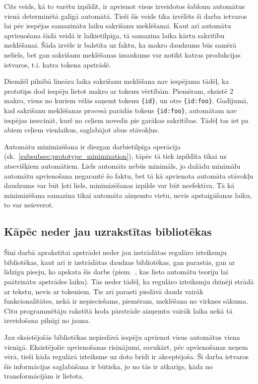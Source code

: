 Cits veids, kā to varētu izpildīt, ir apvienot visus izveidotos šablonu automātus vienā determinētā galīgā automātā. Tieši šīs veids tika izvēlēts šī darba ietvaros lai pēc iespējas samazinātu laiku sakrišanu meklēšanai. Kaut arī automātu apvienošana šādā veidā ir laikietilpīga, tā samazina laika kārtu sakritību meklēšanai. Šāda izvēle ir balstīta uz faktu, ka makro daudzums būs samērā neliels, bet gan sakrišanu meklēšanas izsaukums var notikt katras produkcijas ietvaros, t.i. katra tokena apstrādē.

Diemžēl pilnībā lineāra laika sakrišanu meklēšana nav iespējama tādēļ, ka prototips dod iespēju lietot makro ar tokenu vērtībām. Piemēram, eksistē 2 makro, viens no kuriem vēlās saņemt tokenu \verb|{id}|, un otrs \verb|{id:foo}|. Gadījumā, kad sakrišanu meklēšanas procesā parādās tokens \verb|{id:foo}|, automātam nav iespējas izsecināt, kurš no ceļiem novedīs pie garākas sakritības. Tādēļ tas iet pa abiem ceļiem vienlaikus, saglabājot abus stāvokļus.

Automātu minimizēšana ir diezgan darbietilpīga operācija (sk.~\ref{subsubsec:prototype_minimization}), tāpēc tā tiek izpildīta tikai uz atsevišķiem automātiem. Liels automāts nebūs minimāls, jo dažādu minimālu automātu apvienošana negarantē šo faktu, bet tā kā apvienota automāta stāvokļu daudzums var būt ļoti liels, minimizēšanas izpilde var būt neefektīva. Tā kā minimizēšana samazina tikai automāta aizņemto vietu, nevis apstaigāšanas laiku, to var neieverot.

\subsection{Kāpēc neder jau uzrakstītas bibliotēkas}

Šinī darbā aprakstītai apstrādei neder jau izstrādātas regulāro izteiksmju bibliotēkas, kaut arī ir izstrādātas daudzas bibliotēkas, gan parastās, gan ar līdzīgu pieeju, ko apskata šīs darbs (piem.~\cite{RE2}, kas lieto automātu teoriju lai paātrinātu apstrādes laiku). Tās neder tādēļ, ka regulāro izteiksmju dzinēji strādā ar tekstu, nevis ar tokeniem. Tie arī parasti piedāvā daudz vairāk funkcionalitātes, nekā ir nepieciešams, piemēram, meklēšana no virknes sākuma. Citu programmētāju rakstītā koda pārstrāde aizņemtu vairāk laika nekā tā izveidošana pilnīgi no jauna.

Jau eksistējošās bibliotēkas nepiedāvā iespēju apvienot visus automātus viena vienīgā. Eksistējošie apvienošanas risinājumi, savukārt, pēc apvienošanas neņem vērā, tieši kāda regulārā izteiksme uz doto brīdi ir akceptējoša. Šī darba ietvaros šīs informācijas saglabāšana ir būtiska, jo no tās ir atkarīgs, kāda no transformācijām ir lietota. 


